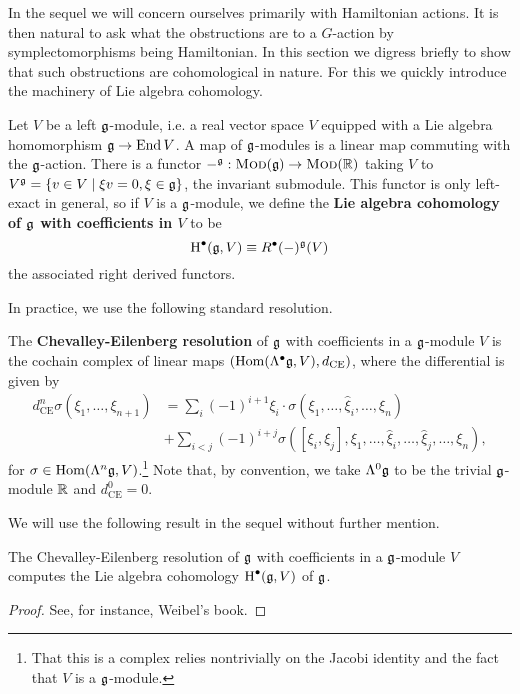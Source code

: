 \documentclass{amsart}
\begin{document}
In the sequel we will concern ourselves primarily with Hamiltonian actions.
It is then natural to ask what the obstructions are to a $G$-action by symplectomorphisms
being Hamiltonian. In this section we digress briefly to show that such obstructions 
are cohomological in nature. For this we quickly introduce the machinery of Lie
algebra cohomology.

\begin{definition}
    Let $V$ be a left $\mathfrak g$-module, i.e. a real vector space $V$ equipped with a Lie algebra
    homomorphism $\mathfrak g\to \operatorname{End} V$. A map of $\mathfrak g$-modules is a linear map commuting with
    the $\mathfrak g$-action. There is a functor $-^\mathfrak g:\textsc{Mod}(\mathfrak g)\to \textsc{Mod}(\mathbb{R})$ taking
    $V$ to $V^\mathfrak g=\{v\in V \mid \xi v=0, \xi\in\mathfrak g\}$, the invariant submodule. This functor
    is only left-exact in general, so if $V$ is a $\mathfrak g$-module, we define the
    \textbf{Lie algebra cohomology of $\mathfrak g$ with coefficients in $V$} to be
    \begin{equation*}
        \operatorname{H}^\bullet(\mathfrak g, V) \equiv R^\bullet(-)^{\mathfrak g}(V)
    \end{equation*}
    the associated right derived functors.
\end{definition}

In practice, we use the following standard resolution.
\begin{definition}
    The \textbf{Chevalley-Eilenberg resolution} of $\mathfrak g$ with coefficients in a $\mathfrak g$-module
    $V$ is the cochain complex of linear maps $(\operatorname{Hom}(\Lambda^\bullet\mathfrak g,V),d_\textrm{CE})$,
    where the differential is given by
    \begin{align*}
        d_\textrm{CE}^n\sigma(\xi_1,\ldots,\xi_{n+1}) &= \sum_i (-1)^{i+1}\xi_i\cdot\sigma(\xi_1,\ldots,\hat\xi_i,\ldots,\xi_n)\\
        &+\sum_{i<j}(-1)^{i+j}\sigma([\xi_i,\xi_j],\xi_1,\ldots,\hat \xi_i,\ldots,\hat \xi_j,\ldots,\xi_n),
    \end{align*}
    for $\sigma\in\operatorname{Hom}(\Lambda^n\mathfrak g,V)$.\footnote{That this is a complex relies nontrivially
    on the Jacobi identity and the fact that $V$ is a $\mathfrak g$-module.}
    Note that, by convention, we take $\Lambda^0\mathfrak g$ to be the trivial $\mathfrak g$-module $\mathbb{R}$
    and $d^0_\textrm{CE}=0$.
\end{definition}

We will use the following result in the sequel without further mention.
\begin{theorem}
    The Chevalley-Eilenberg resolution of $\mathfrak g$ with coefficients in a $\mathfrak g$-module
    $V$ computes the Lie algebra cohomology $\operatorname{H}^\bullet(\mathfrak g,V)$ of $\mathfrak g$.
\end{theorem}
\begin{proof}
    See, for instance, Weibel's book.
\end{proof}
\end{document}
